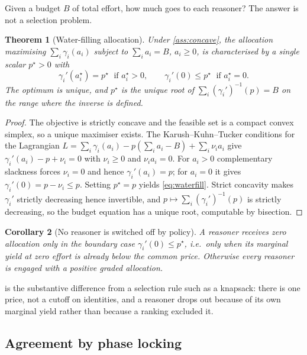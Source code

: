 \documentclass[11pt,twocolumn,a4paper]{article}
\theoremstyle{plain}
\newtheorem{theorem}{Theorem}[section]
\newtheorem{corollary}[theorem]{Corollary}
\theoremstyle{definition}
\theoremstyle{remark}
\begin{document}
Given a budget $B$ of total effort, how much goes to each reasoner? The answer
is not a selection problem.

\begin{theorem}[Water-filling allocation]
\label{thm:waterfill}
Under \cref{ass:concave}, the allocation maximising
$\sum_i \gamma_i(a_i)$ subject to $\sum_i a_i = B$, $a_i\ge0$, is characterised
by a single scalar $p^\star > 0$ with
\begin{equation}
\gamma_i'(a_i^\star) = p^\star \;\text{ if } a_i^\star > 0,
\qquad
\gamma_i'(0) \le p^\star \;\text{ if } a_i^\star = 0.
\label{eq:waterfill}
\end{equation}
The optimum is unique, and $p^\star$ is the unique root of
$\sum_i (\gamma_i')^{-1}(p) = B$ on the range where the inverse is defined.
\end{theorem}

\begin{proof}
The objective is strictly concave and the feasible set is a compact convex
simplex, so a unique maximiser exists. The Karush--Kuhn--Tucker conditions
\citep{Boyd2004} for the Lagrangian
$L = \sum_i\gamma_i(a_i) - p(\sum_i a_i - B) + \sum_i\nu_i a_i$
give $\gamma_i'(a_i) - p + \nu_i = 0$ with $\nu_i\ge0$ and $\nu_i a_i = 0$.
For $a_i>0$ complementary slackness forces $\nu_i=0$ and hence
$\gamma_i'(a_i)=p$; for $a_i=0$ it gives $\gamma_i'(0) = p - \nu_i \le p$.
Setting $p^\star = p$ yields \cref{eq:waterfill}. Strict concavity makes
$\gamma_i'$ strictly decreasing hence invertible, and
$p\mapsto\sum_i(\gamma_i')^{-1}(p)$ is strictly decreasing, so the budget
equation has a unique root, computable by bisection.
\end{proof}

\begin{corollary}[No reasoner is switched off by policy]
\label{cor:graded}
A reasoner receives zero allocation only in the boundary case
$\gamma_i'(0)\le p^\star$, i.e.\ only when its marginal yield at zero effort is
already below the common price. Otherwise every reasoner is engaged with a
positive graded allocation.
\end{corollary}

 is the substantive difference from a selection rule such as a
knapsack: there is one price, not a cutoff on identities, and a reasoner drops
out because of its own marginal yield rather than because a ranking excluded it.

\subsection{Agreement by phase locking}
\end{document}
